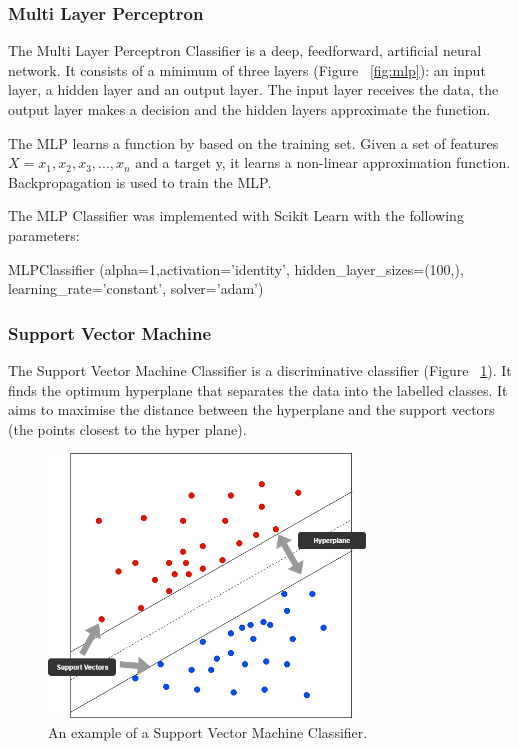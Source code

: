 \subsubsection*{Multi Layer Perceptron}

The Multi Layer Perceptron Classifier is a deep, feedforward, artificial neural network. It consists of a minimum of three layers (Figure ~\ref{fig:mlp}): an input layer, a hidden layer and an output layer. The input layer receives the data, the output layer makes a decision and the hidden layers approximate the function.

The MLP learns a function by based on the training set. Given a set of features $X = x_1,x_2,x_3,...,x_n$ and a target y, it learns a non-linear approximation function. Backpropagation is used to train the MLP.

The MLP Classifier was implemented with Scikit Learn with the following parameters:

\begin{tcolorbox}
\begin{center}
	MLPClassifier (alpha=1,activation='identity', hidden\_layer\_sizes=(100,), learning\_rate='constant', solver='adam')
\end{center}
\end{tcolorbox}

\subsubsection*{Support Vector Machine}

The Support Vector Machine Classifier is a discriminative classifier (Figure ~\ref{fig:svm}). It finds the optimum hyperplane that separates the data into the labelled classes. It aims to maximise the distance between the hyperplane and the support vectors (the points closest to the hyper plane).

\begin{figure}[h!]
\centering
\includegraphics[width=0.75\textwidth]{design_and_methodology/svm.png}
\caption{\label{fig:svm} An example of a Support Vector Machine Classifier.}
\end{figure}

